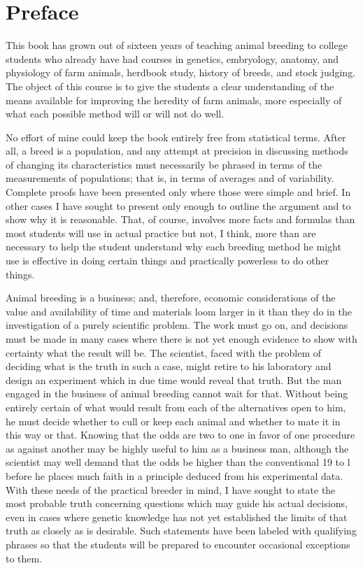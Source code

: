 \chapter{Preface}
This book has grown out of sixteen years of teaching animal breeding to college students who already have had
courses in genetics, embryology, anatomy, and physiology of farm animals, herdbook study, history of breeds,
and stock judging. The object of this course is to give the students a clear understanding of the means available
for improving the heredity of farm animals, more especially of what each possible method will or will not do well.

No effort of mine could keep the book entirely free from statistical terms. After all, a breed is a population, and
any attempt at precision in discussing methods of changing its characteristics must necessarily be phrased in terms
of the measurements of populations; that is, in terms of averages and of variability. Complete proofs have been
presented only where those were simple and brief. In other cases I have sought to present only enough to outline the 
argument and to show why it is reasonable. That, of course, involves more facts and formulas than most students will use 
in actual practice but not, I think, more than are necessary to help the student understand why each breeding method he 
might use is effective in doing certain things and practically powerless to do other things.

Animal breeding is a business; and, therefore, economic considerations of the value and availability of time and materials 
loom larger in it than they do in the investigation of a purely scientific problem. The work must go on, and decisions 
must be made in many cases where there is not yet enough evidence to show with certainty what the result will be. The 
scientist, faced with the problem of deciding what is the truth in such a case, might retire to his laboratory and design 
an experiment which in due time would reveal that truth. But the man engaged in the business of animal breeding cannot 
wait for that. Without being entirely certain of what would result from each of the alternatives open to him, he must 
decide whether to cull or keep each animal and whether to mate it in this way or that. Knowing that the odds are two to 
one in favor of one procedure as against another may be highly useful to him as a business man, although the scientist 
may well demand that the odds be higher than the conventional 19 to l before he places much faith in a principle deduced 
from his experimental data. With these needs of the practical breeder in mind, I have sought to state the most probable 
truth concerning questions which may guide his actual decisions, even in cases where genetic knowledge has not yet 
established the limits of that truth as closely as is desirable. Such statements have been labeled with qualifying phrases 
so that the students will be prepared to encounter occasional exceptions to them.

